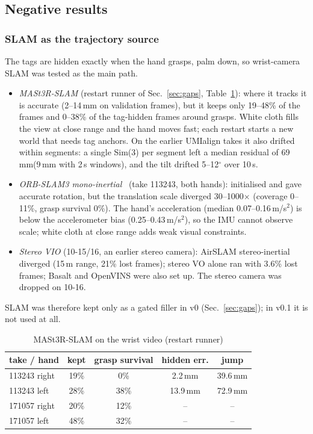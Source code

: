 \documentclass[conference,10pt]{IEEEtran}
\newcommand{\mm}{\,mm\xspace}
\begin{document}
\subsection{Negative results}\label{sec:neg}
\subsubsection{SLAM as the trajectory source}\label{sec:slam}
The tags are hidden exactly when the hand grasps, palm down, so wrist-camera SLAM was tested as the main path.
\begin{itemize}
\item \emph{MASt3R-SLAM} (restart runner of Sec.~\ref{sec:gaps}, Table~\ref{tab:slam}): where it tracks it is accurate
  (2--14\mm on validation frames), but it keeps only 19--48\% of the frames and 0--38\% of the tag-hidden frames around
  grasps. White cloth fills the view at close range and the hand moves fast; each restart starts a new world that needs tag
  anchors. On the earlier UMIalign takes it also drifted within segments: a single Sim(3) per segment left a median
  residual of 69\mm (9\mm with 2\,s windows), and the tilt drifted 5--12$^\circ$ over 10\,s.
\item \emph{ORB-SLAM3 mono-inertial}~\cite{campos2021orbslam3} (take 113243, both hands): initialised and gave accurate
  rotation, but the translation scale diverged 30--1000$\times$ (coverage 0--11\%, grasp survival 0\%). The hand's
  acceleration (median 0.07--0.16\,m/s$^2$) is below the accelerometer bias (0.25--0.43\,m/s$^2$), so the IMU cannot
  observe scale; white cloth at close range adds weak visual constraints.
\item \emph{Stereo VIO} (10-15/16, an earlier stereo camera): AirSLAM stereo-inertial diverged (15\,m range, 21\% lost
  frames); stereo VO alone ran with 3.6\% lost frames; Basalt and OpenVINS were also set up. The stereo camera was dropped
  on 10-16.
\end{itemize}
SLAM was therefore kept only as a gated filler in v0 (Sec.~\ref{sec:gaps}); in v0.1 it is not used at all.

\begin{table}[t]
\caption{MASt3R-SLAM on the wrist video (restart runner)}\label{tab:slam}
\centering\small
\begin{tabular}{@{}lcccc@{}}
\toprule
take / hand & kept & grasp survival & hidden err. & jump \\
\midrule
113243 right & 19\% & 0\% & 2.2\mm & 39.6\mm \\
113243 left & 28\% & 38\% & 13.9\mm & 72.9\mm \\
171057 right & 20\% & 12\% & -- & -- \\
171057 left & 48\% & 32\% & -- & -- \\
\bottomrule
\end{tabular}
\end{table}
\end{document}
